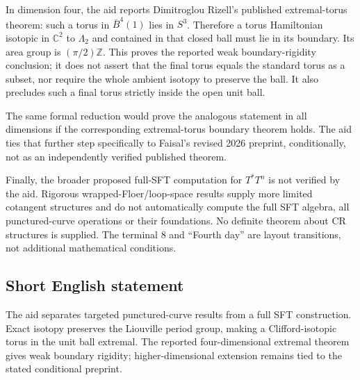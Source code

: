 \documentclass[11pt]{article}
\newcommand{\Z}{\mathbb{Z}}
\newcommand{\C}{\mathbb{C}}
\begin{document}
In dimension four, the aid reports Dimitroglou Rizell's published extremal-torus theorem: such a torus in \(\overline B^4(1)\) lies in \(S^3\). Therefore a torus Hamiltonian isotopic in \(\C^2\) to \(\Lambda_2\) and contained in that closed ball must lie in its boundary. Its area group is \((\pi/2)\Z\). This proves the reported weak boundary-rigidity conclusion; it does not assert that the final torus equals the standard torus as a subset, nor require the whole ambient isotopy to preserve the ball. It also precludes such a final torus strictly inside the open unit ball.

The same formal reduction would prove the analogous statement in all dimensions if the corresponding extremal-torus boundary theorem holds. The aid ties that further step specifically to Faisal's revised 2026 preprint, conditionally, not as an independently verified published theorem.

Finally, the broader proposed full-SFT computation for \(T^*T^n\) is not verified by the aid. Rigorous wrapped-Floer/loop-space results supply more limited cotangent structures and do not automatically compute the full SFT algebra, all punctured-curve operations or their foundations. No definite theorem about CR structures is supplied. The terminal 8 and ``Fourth day'' are layout transitions, not additional mathematical conditions.
\subsection{Short English statement}
The aid separates targeted punctured-curve results from a full SFT construction. Exact isotopy preserves the Liouville period group, making a Clifford-isotopic torus in the unit ball extremal. The reported four-dimensional extremal theorem gives weak boundary rigidity; higher-dimensional extension remains tied to the stated conditional preprint.
\end{document}
